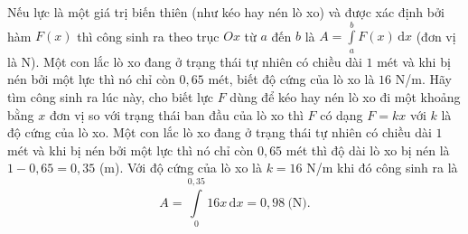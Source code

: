 \begin{bt}%
Nếu lực là một giá trị biến thiên (như kéo hay nén lò xo) và được xác định bởi hàm $F(x)$ thì công sinh ra theo trục $Ox$ từ $a$ đến $b$ là $A=\displaystyle\int\limits_{a}^{b} F(x)\mathrm{\,d}x$ (đơn vị là N). Một con lắc lò xo đang ở trạng thái tự nhiên có chiều dài $1$ mét và khi bị nén bởi một lực thì nó chỉ còn $0{,}65$ mét, biết độ cứng của lò xo là $16$ N/m. Hãy tìm công sinh ra lúc này, cho biết lực $F$ dùng để kéo hay nén lò xo đi một khoảng bằng $x$ đơn vị so với trạng thái ban đầu của lò xo thì $F$ có dạng $F=kx$ với $k$ là độ cứng của lò xo.
\loigiai
{
Một con lắc lò xo đang ở trạng thái tự nhiên có chiều dài $1$ mét và khi bị nén bởi một lực thì nó chỉ còn $0{,}65$ mét thì độ dài lò xo bị nén là $1-0{,}65=0{,}35$ (m). Với độ cứng của lò xo là $k=16$ N/m khi đó công sinh ra là
$$A=\displaystyle\int\limits_{0}^{0{,}35} 16x\mathrm{\,d}x=0{,}98 \ \text{(N).}$$
}
\end{bt}

